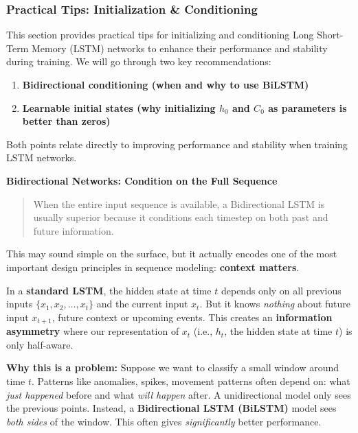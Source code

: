 \subsubsection{Practical Tips: Initialization \& Conditioning}

This section provides practical tips for initializing and conditioning Long Short-Term Memory (LSTM) networks to enhance their performance and stability during training. We will go through two key recommendations:
\begin{enumerate}
    \item \textbf{Bidirectional conditioning (when and why to use BiLSTM)}
    \item \textbf{Learnable initial states (why initializing $h_0$ and $C_0$ as parameters is better than zeros)}
\end{enumerate}
Both points relate directly to improving performance and stability when training LSTM networks.

\highspace
\begin{flushleft}
    \textcolor{Green3}{\faIcon{\speedIcon} \textbf{Bidirectional Networks: Condition on the Full Sequence}}
\end{flushleft}
\begin{quote}
     When the entire input sequence is available, a Bidirectional LSTM is usually superior because it conditions each timestep on both past and future information.
\end{quote}
This may sound simple on the surface, but it actually encodes one of the most important design principles in sequence modeling: \textbf{context matters}.

\highspace
In a \textbf{standard LSTM}, the hidden state at time $t$ depends only on all previous inputs $\{x_1, x_2, \ldots, x_t\}$ and the current input $x_t$. But it knows \emph{nothing} about future input $x_{t+1}$, future context or upcoming events. This creates an \textbf{information asymmetry} where our representation of $x_t$ (i.e., $h_t$, the hidden state at time $t$) is only half-aware.

\highspace
\textcolor{Red2}{ \textbf{Why this is a problem:}} Suppose we want to classify a small window around time $t$. Patterns like anomalies, spikes, movement patterns often depend on: what \emph{just happened} before and what \emph{will happen} after. A unidirectional model only sees the previous points. Instead, a \textbf{Bidirectional LSTM (BiLSTM)} model sees \emph{both sides} of the window. This often gives \emph{significantly} better performance.

